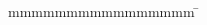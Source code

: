\begin{spacing}{1.5}
\begin{tabbing}

    mmmmmmmmmmmmmmmm \= \kill
    {\authorPhrase} \> {\getNameAndNumber{\documentAuthor}{\matriculationNumber}}

    \ifdefempty{\secondAuthor} %
        {}
        {
            \\ \> {\getNameAndNumber{\secondAuthor}{\secondMatriculationNumber}}
        }

    \ifdefempty{\thirdAuthor} %
        {}
        {
            \\ \> {\getNameAndNumber{\thirdAuthor}{\thirdMatriculationNumber}}
        }

    \ifdefempty{\fourthAuthor} %
        {}
        {
            \\ \> {\getNameAndNumber{\fourthAuthor}{\fourthMatriculationNumber}}
        }

    \ifdefempty{\fifthAuthor} %
        {}
        {
            \\ \> {\getNameAndNumber{\fifthAuthor}{\fifthMatriculationNumber}}
        }


    \ifdefempty{\secondExaminer} %
        {
            \\{\onlyExaminerPhrase} \> {\firstExaminer}
        }
        {
            \\{\firstExaminerPhrase} \> {\firstExaminer}
            \\{\secondExaminerPhrase} \> {\secondExaminer}
        }

    \ifdefempty{\coSupervisor} %
        {}
        {
            \\{\coSupervisorPhrase} \> {\coSupervisor}
        }
        
    \ifdefempty{\courseOfStudies} %
        {}
        {
            \\{\courseOfStudiesPhrase} \> {\courseOfStudies}
        }        

    \\{\submissionDatePhrase} \> {\submissionDate}

\end{tabbing}
\end{spacing}
